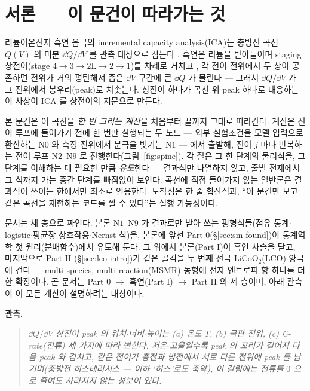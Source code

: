 \section*{서론 --- 이 문건이 따라가는 것}

리튬이온전지 흑연 음극의 incremental capacity analysis(ICA)는 충방전 곡선 $Q(V)$ 의 미분
$\dd Q/\dd V$ 를 관측 대상으로 삼는다 \cite{bloom2005,dubarry2012}. 흑연은 리튬을 받아들이며 staging
상전이(stage $4\!\to\!3\!\to\!2\mathrm L\!\to\!2\!\to\!1$)를 차례로 거치고 \cite{dahn1991,ohzuku1993}, 각 전이
전위에서 두 상이 공존하면 전위가 거의 평탄해져 좁은 $\dd V$ 구간에 큰 $\dd Q$ 가 몰린다 --- 그래서
$\dd Q/\dd V$ 가 그 전위에서 봉우리(peak)로 치솟는다. 상전이 하나가 곡선 위 peak 하나로 대응하는 이
사상이 ICA 를 상전이의 지문으로 만든다.

본 문건은 이 곡선을 \emph{한 번 그리는 계산}을 처음부터 끝까지 그대로 따라간다. 계산은 전이 루프에 들어가기 전에
한 번만 실행되는 두 노드 --- 외부 실험조건을 모델 입력으로 환산하는 $\mathrm N0$ 와 측정 전위에서 분극을 벗기는
$\mathrm N1$ --- 에서 출발해, 전이 $j$ 마다 반복하는 전이 루프 $\mathrm N2$--$\mathrm N9$ 로 진행한다(그림~\ref{fig:spine}). 각 절은 그 한 단계의 물리식을, 그 단계를
이해하는 데 필요한 만큼 \emph{유도}한다 --- 결과식만 나열하지 않고, 출발 전제에서 그 식까지 가는 중간
단계를 빠짐없이 보인다. 곡선에 직접 들어가지 않는 일반론은 결과식이 쓰이는 한에서만 최소로 인용한다.
도착점은 한 줄 합산식과, ``이 문건만 보고 같은 곡선을 재현하는 코드를 짤 수 있다''는 실행 가능성이다.

문서는 세 층으로 짜인다. 본론 $\mathrm N1$--$\mathrm N9$ 가 결과로만 받아 쓰는 평형식들(점유 통계$\cdot$
logistic$\cdot$평균장 상호작용$\cdot$Nernst 식)을, 본론에 앞선 Part 0(\S\ref{sec:sm-found})이 통계역학 첫
원리(분배함수)에서 유도해 둔다. 그 위에서 본론(Part I)이 흑연 사슬을 닫고, 마지막으로 Part II
(\S\ref{sec:lco-intro})가 같은 골격을 두 번째 전극 $\mathrm{LiCoO_2}$(LCO) 양극에 건다 --- multi-species,
multi-reaction(MSMR) 동형에 전자 엔트로피 항 하나를 더한 확장이다. 곧 문서는 Part 0 $\to$ 흑연(Part I)
$\to$ Part II 의 세 층이며, 아래 관측이 이 모든 계산이 설명하려는 대상이다.

\textbf{관측.}
\begin{quote}\itshape
$\dd Q/\dd V$ 상전이 peak 의 위치$\cdot$너비$\cdot$높이는 (a) 온도 $T$, (b) 극판 전위, (c) C-rate(전류)
세 가지에 따라 변한다. 저온$\cdot$고율일수록 peak 의 꼬리가 길어져 다음 peak 와 겹치고, 같은 전이가 충전과 방전에서
서로 다른 전위에 peak 를 남기며(충방전 히스테리시스 --- 이하 `히스'로도 축약), 이 갈림에는 전류를 $0$ 으로 줄여도 사라지지 않는 성분이 있다.
\end{quote}

